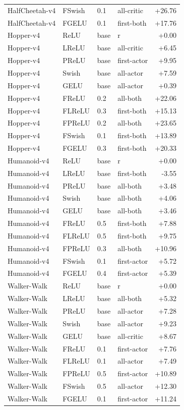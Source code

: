{\begin{longtable}{llllr}
HalfCheetah-v4 & FSwish & 0.1 & all-critic & +26.76 \\
HalfCheetah-v4 & FGELU & 0.1 & first-both & +17.76 \\
Hopper-v4 & ReLU & base & r & +0.00 \\
Hopper-v4 & LReLU & base & all-critic & +6.45 \\
Hopper-v4 & PReLU & base & first-actor & +9.95 \\
Hopper-v4 & Swish & base & all-actor & +7.59 \\
Hopper-v4 & GELU & base & all-actor & +0.39 \\
Hopper-v4 & FReLU & 0.2 & all-both & +22.06 \\
Hopper-v4 & FLReLU & 0.3 & first-both & +15.13 \\
Hopper-v4 & FPReLU & 0.2 & all-both & +23.65 \\
Hopper-v4 & FSwish & 0.1 & first-both & +13.89 \\
Hopper-v4 & FGELU & 0.3 & first-both & +20.33 \\
Humanoid-v4 & ReLU & base & r & +0.00 \\
Humanoid-v4 & LReLU & base & first-both & -3.55 \\
Humanoid-v4 & PReLU & base & all-both & +3.48 \\
Humanoid-v4 & Swish & base & all-both & +4.06 \\
Humanoid-v4 & GELU & base & all-both & +3.46 \\
Humanoid-v4 & FReLU & 0.5 & first-both & +7.88 \\
Humanoid-v4 & FLReLU & 0.5 & first-both & +9.75 \\
Humanoid-v4 & FPReLU & 0.3 & all-both & +10.96 \\
Humanoid-v4 & FSwish & 0.1 & first-actor & +5.72 \\
Humanoid-v4 & FGELU & 0.4 & first-actor & +5.39 \\
Walker-Walk & ReLU & base & r & +0.00 \\
Walker-Walk & LReLU & base & all-both & +5.32 \\
Walker-Walk & PReLU & base & all-actor & +7.28 \\
Walker-Walk & Swish & base & all-actor & +9.23 \\
Walker-Walk & GELU & base & all-critic & +8.67 \\
Walker-Walk & FReLU & 0.1 & first-actor & +7.76 \\
Walker-Walk & FLReLU & 0.1 & all-actor & +7.49 \\
Walker-Walk & FPReLU & 0.5 & first-actor & +10.89 \\
Walker-Walk & FSwish & 0.5 & all-actor & +12.30 \\
Walker-Walk & FGELU & 0.1 & first-actor & +11.24 \\
\end{longtable}
}
